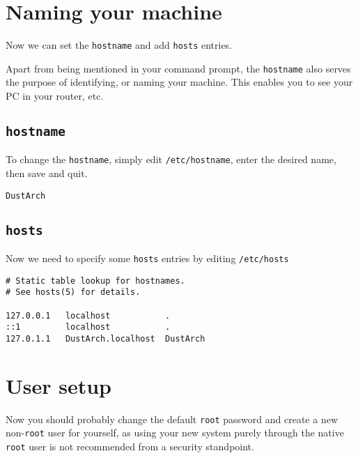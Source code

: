 \documentclass[9pt]{report}
\begin{document}
\newpage

\hypertarget{x-naming-your-machine}{\section{Naming your machine}}
Now we can set the \texttt{hostname} and add \texttt{hosts} entries.


Apart from being mentioned in your command prompt, the \texttt{hostname} also serves the purpose of identifying, or naming your machine.
This enables you to see your PC in your router, etc.



\newpage

\hypertarget{x-hostname}{\subsection{\texttt{hostname}}}
To change the \texttt{hostname}, simply edit \texttt{/etc/hostname}, enter the desired name, then save and quit.


\begin{verbatim}
DustArch
\end{verbatim}


\newpage

\hypertarget{x-hosts}{\subsection{\texttt{hosts}}}
Now we need to specify some \texttt{hosts} entries by editing \texttt{/etc/hosts}


\begin{verbatim}
# Static table lookup for hostnames.
# See hosts(5) for details.

127.0.0.1   localhost           .
::1         localhost           .
127.0.1.1   DustArch.localhost  DustArch
\end{verbatim}


\newpage

\hypertarget{x-user-setup}{\section{User setup}}
Now you should probably change the default \texttt{root} password and create a new non-\texttt{root} user for yourself, as using your new system purely through the native \texttt{root} user is not recommended from a security standpoint.



\newpage
\end{document}
